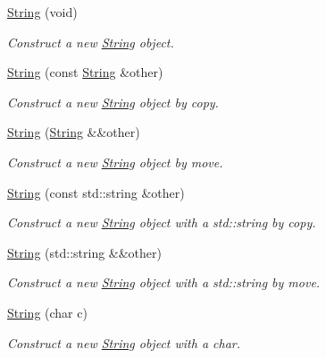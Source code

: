 \begin{DoxyCompactItemize}
\item 
\mbox{\hyperlink{classo_a_1_1_string_a10ce41917f151b304f0b465c1ff1ec6e}{String}} (void)
\begin{DoxyCompactList}\small\item\em Construct a new \mbox{\hyperlink{classo_a_1_1_string}{String}} object. \end{DoxyCompactList}\item 
\mbox{\hyperlink{classo_a_1_1_string_adeb13912c55cdc0406b5960d75d74fb2}{String}} (const \mbox{\hyperlink{classo_a_1_1_string}{String}} \&other)
\begin{DoxyCompactList}\small\item\em Construct a new \mbox{\hyperlink{classo_a_1_1_string}{String}} object by copy. \end{DoxyCompactList}\item 
\mbox{\hyperlink{classo_a_1_1_string_ae728fbb314314b37c103d3b22ca4c3a9}{String}} (\mbox{\hyperlink{classo_a_1_1_string}{String}} \&\&other)
\begin{DoxyCompactList}\small\item\em Construct a new \mbox{\hyperlink{classo_a_1_1_string}{String}} object by move. \end{DoxyCompactList}\item 
\mbox{\hyperlink{classo_a_1_1_string_a7406ec03e50352320d8809a78e12a9fa}{String}} (const std\+::string \&other)
\begin{DoxyCompactList}\small\item\em Construct a new \mbox{\hyperlink{classo_a_1_1_string}{String}} object with a std\+::string by copy. \end{DoxyCompactList}\item 
\mbox{\hyperlink{classo_a_1_1_string_a0b5007bec6fe6f6c8917ecc4febbbd1c}{String}} (std\+::string \&\&other)
\begin{DoxyCompactList}\small\item\em Construct a new \mbox{\hyperlink{classo_a_1_1_string}{String}} object with a std\+::string by move. \end{DoxyCompactList}\item 
\mbox{\hyperlink{classo_a_1_1_string_a5289dc4246f8adf29ade43156ad4a703}{String}} (char c)
\begin{DoxyCompactList}\small\item\em Construct a new \mbox{\hyperlink{classo_a_1_1_string}{String}} object with a char. \end{DoxyCompactList}\item 

\end{DoxyCompactItemize}
